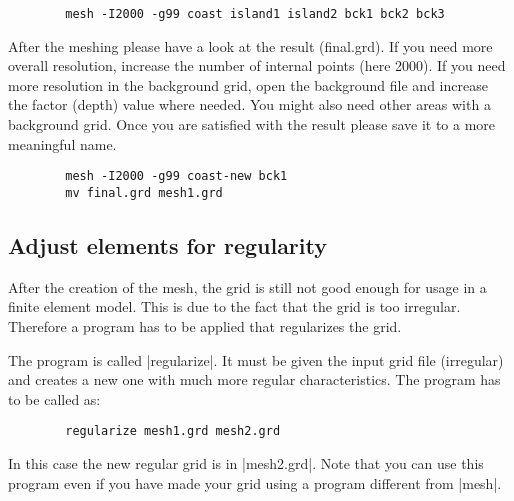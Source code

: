 \begin{verbatim}
        mesh -I2000 -g99 coast island1 island2 bck1 bck2 bck3
\end{verbatim}

After the meshing please have a look at the result (final.grd).
If you need more overall resolution, increase the number of internal
points (here 2000). If you need more resolution in the background grid,
open the background file and increase the factor (depth) value where needed.
You might also need other areas with a background grid. Once you
are satisfied with the result please save it to a more meaningful name.

\begin{verbatim}
        mesh -I2000 -g99 coast-new bck1
        mv final.grd mesh1.grd
\end{verbatim}

\subsection{Adjust elements for regularity}

After the creation of the mesh, the grid is still not good enough
for usage in a finite element model. This is due to the fact that
the grid is too irregular. Therefore a program has to be applied
that regularizes the grid.

The program is called |regularize|. It must be given the input grid file
(irregular) and creates a new one with much more regular characteristics.
The program has to be called as:

\begin{verbatim}
        regularize mesh1.grd mesh2.grd
\end{verbatim}

In this case the new regular grid is in |mesh2.grd|. Note that you
can use this program even if you have made your grid using a program
different from |mesh|.

